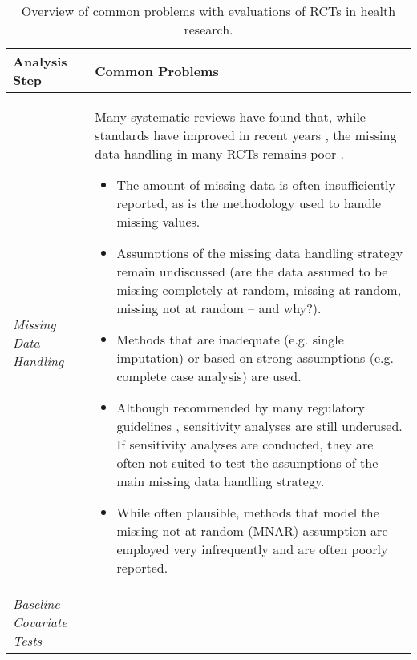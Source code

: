 \begin{table}[!htbp]
    \caption{Overview of common problems with evaluations of RCTs in health research.}
    \label{crouch}
    \footnotesize
    \begin{tabular}{  p{3cm}  p{11cm} }
        \toprule
\textbf{Analysis Step}      
& \textbf{Common Problems}\\\midrule

\vspace{1mm}
\emph{Missing Data Handling}    

& 
\vspace{1mm}
Many systematic reviews have found that, while standards have improved in recent years \citep{bell2014handling}, the missing data handling in many RCTs remains poor \citep{akl2012potential, akl2015reporting, bell2014handling, powney2014review, rabe2018missing, tan2021review}. 
\begin{itemize}
    \item The amount of missing data is often insufficiently reported, as is the methodology used to handle missing values.
    \item Assumptions of the missing data handling strategy remain undiscussed (are the data assumed to be missing completely at random, missing at random, missing not at random – and why?).
    \item Methods that are inadequate (e.g. single imputation) or based on strong assumptions (e.g. complete case analysis) are used.
    \item Although recommended by many regulatory guidelines \citep{cro2020sensitivity}, sensitivity analyses are still underused. If sensitivity analyses are conducted, they are often not suited to test the assumptions of the main missing data handling strategy. 
    \item While often plausible, methods that model the missing not at random (MNAR) assumption are employed very infrequently and are often poorly reported. 
\end{itemize} \vspace{1mm} \\\hline
\vspace{1mm}
\emph{Baseline Covariate \newline Tests}    


\end{tabular}
\end{table}
